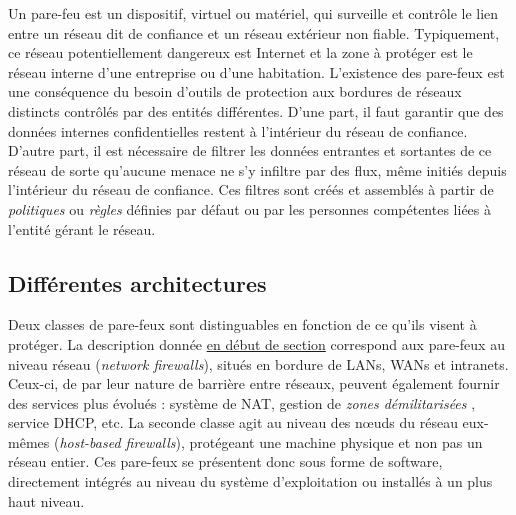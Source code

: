\documentclass[]{article}
\newcommand{\minit}[1]{\noindent{\small\textbf{ \underline{#1}}}\vspace{0.2cm}}
\begin{document}
Un pare-feu est un dispositif, virtuel ou matériel, qui surveille et contrôle le lien entre un réseau dit de confiance et un réseau extérieur non fiable. Typiquement, ce réseau potentiellement dangereux est Internet et la zone à protéger est le réseau interne d'une entreprise ou d'une habitation. L'existence des pare-feux est une conséquence du besoin d'outils de protection aux bordures de réseaux distincts contrôlés par des entités différentes. D'une part, il faut garantir que des données internes confidentielles restent à l'intérieur du réseau de confiance. D'autre part, il est nécessaire de filtrer les données entrantes et sortantes de ce réseau de sorte qu'aucune menace ne s'y infiltre par des flux, même initiés depuis l'intérieur du réseau de confiance. Ces filtres sont créés et assemblés à partir de \textit{politiques} ou \textit{règles} définies par défaut ou par les personnes compétentes liées à l'entité gérant le réseau.

\subsection{Différentes architectures}

\par Deux classes de pare-feux sont distinguables en fonction de ce qu'ils visent à protéger. La description donnée \hyperref[gen_FW]{en début de section} correspond aux pare-feux au niveau réseau (\textit{network firewalls}), situés en bordure de LANs, WANs et intranets. Ceux-ci, de par leur nature de barrière entre réseaux, peuvent également fournir des services plus évolués : système de NAT, gestion de \textit{zones démilitarisées} \cite{Shimonski2013}, service DHCP, etc. La seconde classe agit au niveau des nœuds du réseau eux-mêmes (\textit{host-based firewalls}), protégeant une machine physique et non pas un réseau entier. Ces pare-feux se présentent donc sous forme de software, directement intégrés au niveau du système d'exploitation ou installés à un plus haut niveau.\\

\minit{Les pare-feux niveau réseau}\label{netw_fw}
\end{document}
